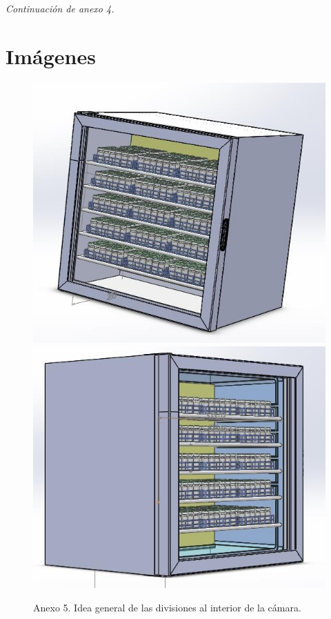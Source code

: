 	
	 \newpage
	\begin{table}[H]
		\centering
		\caption*{\textit{Continuación de anexo 4.}}\rsp\rsp\rsp\rsp
		
		\label{anexo:bohn-perecederos2}
	\end{table}
	
	\newpage
	\section*{Imágenes}
	
	\begin{figure}[H]
		\centering
		\includegraphics[width=0.415\linewidth]{figures/axo-parrilasycharolas}	\includegraphics[width=0.415\linewidth]{figures/axo-parrilasycharolas2}
		\caption*{Anexo 5. Idea general de las divisiones al interior de la cámara.}
		\label{axo-design-div}
	\end{figure}
	
